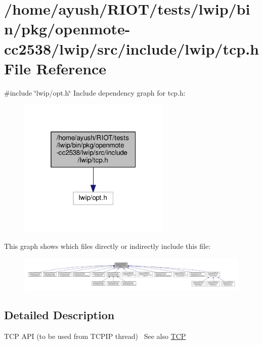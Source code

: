\hypertarget{openmote-cc2538_2lwip_2src_2include_2lwip_2tcp_8h}{}\section{/home/ayush/\+R\+I\+O\+T/tests/lwip/bin/pkg/openmote-\/cc2538/lwip/src/include/lwip/tcp.h File Reference}
\label{openmote-cc2538_2lwip_2src_2include_2lwip_2tcp_8h}
{\ttfamily \#include \char`\"{}lwip/opt.\+h\char`\"{}}\newline
Include dependency graph for tcp.\+h\+:
\nopagebreak
\begin{figure}[H]
\begin{center}
\leavevmode
\includegraphics[width=205pt]{openmote-cc2538_2lwip_2src_2include_2lwip_2tcp_8h__incl}
\end{center}
\end{figure}
This graph shows which files directly or indirectly include this file\+:
\nopagebreak
\begin{figure}[H]
\begin{center}
\leavevmode
\includegraphics[width=350pt]{openmote-cc2538_2lwip_2src_2include_2lwip_2tcp_8h__dep__incl}
\end{center}
\end{figure}


\subsection{Detailed Description}
T\+CP A\+PI (to be used from T\+C\+P\+IP thread)~\newline
See also \hyperlink{group__tcp__raw}{T\+CP} 